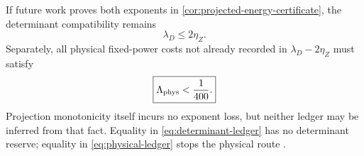 If future work proves both exponents in
\cref{cor:projected-energy-certificate}, the determinant
compatibility remains
\begin{equation}
 \boxed{\lambda_D\le2\eta_Z.}
\label{eq:determinant-ledger}
\end{equation}
Separately, all physical fixed-power costs not already recorded in
\(\lambda_D-2\eta_Z\) must satisfy
\begin{equation}
 \boxed{\Lambda_{\rm phys}<\frac1{400}.}
\label{eq:physical-ledger}
\end{equation}
Projection monotonicity itself incurs no exponent loss, but neither
ledger may be inferred from that fact.  Equality in
\eqref{eq:determinant-ledger} has no determinant reserve; equality
in \eqref{eq:physical-ledger} stops the physical route
\citep{WangTPC92}.
